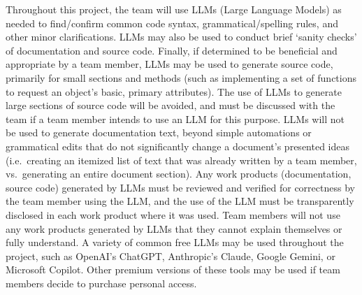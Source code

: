 Throughout this project, the team will use LLMs (Large Language Models) as 
needed to find/confirm common code syntax, grammatical/spelling rules, and 
other minor clarifications. LLMs may also be used to conduct brief `sanity 
checks' of documentation and source code. Finally, if determined to be 
beneficial and appropriate by a team member, LLMs may be used to generate 
source code, primarily for small sections and methods (such as implementing a 
set of functions to request an object's basic, primary attributes). The use of 
LLMs to generate large sections of source code will be avoided, and must be 
discussed with the team if a team member intends to use an LLM for this 
purpose. LLMs will not be used to generate documentation text, beyond simple 
automations or grammatical edits that do not significantly change a document's 
presented ideas (i.e.~creating an itemized list of text that was already 
written by a team member, vs.~generating an entire document section).
\newline \newline
Any work products (documentation, source code) generated by LLMs must be 
reviewed and verified for correctness by the team member using the LLM, and the 
use of the LLM must be transparently disclosed in each work product where it 
was 
used. Team members will not use any work products generated by LLMs that they 
cannot explain themselves or fully understand.
\newline \newline
A variety of common free LLMs may be used throughout the project, 
such as OpenAI's ChatGPT, Anthropic's Claude, Google Gemini, or Microsoft 
Copilot. Other premium versions of these tools may be used if team members 
decide to purchase personal access.